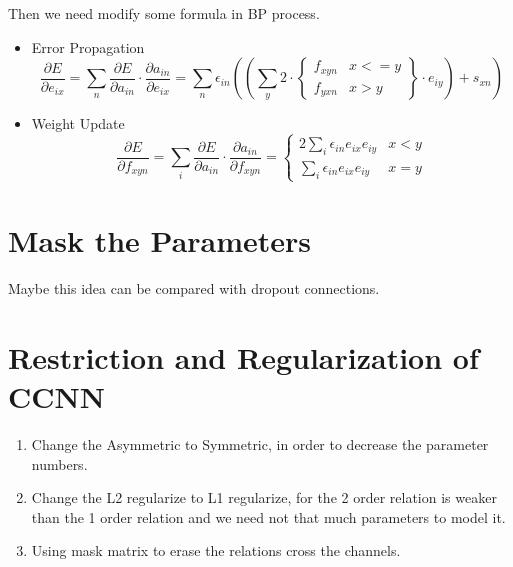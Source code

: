 \documentclass[12pt]{article}
\begin{document}
Then we need modify some formula in BP process.
\begin{itemize}
    \item Error Propagation
    \begin{equation}
    \frac{\partial E}{\partial e_{ix}} = \sum_n \frac{\partial E}{\partial a_{in}} \cdot \frac{\partial a_{in}}{\partial e_{ix}} = \sum_n  \epsilon_{in} ((\sum_y 2 \cdot
    \left \{ 
        \begin{array}{ll}
        f_{xyn} & x<=y \\
        f_{yxn} & x>y
        \end{array}
    \right \}
    \cdot e_{iy}) + s_{xn})
    \end{equation}

    \item Weight Update
    \begin{equation}
    \frac{\partial E}{\partial f_{xyn}} = \sum_i \frac{\partial E}{\partial a_{in}} \cdot \frac{\partial a_{in}}{\partial f_{xyn}} = 
    \left \{
        \begin{array}{ll}
        2 \sum_i  \epsilon_{in} e_{ix} e_{iy} & x<y \\
        \sum_i  \epsilon_{in} e_{ix} e_{iy} & x=y
        \end{array}
    \right .
    \end{equation}

\end{itemize}

\section{Mask the Parameters}
Maybe this idea can be compared with dropout connections.

\section{Restriction and Regularization of CCNN}
\begin{enumerate}
    \item Change the Asymmetric to Symmetric, in order to decrease the parameter numbers.
    \item Change the L2 regularize to L1 regularize, for the 2 order relation is weaker than the 1 order relation and we need not that much parameters to model it.
    \item Using mask matrix to erase the relations cross the channels.
\end{enumerate}
\end{document}
